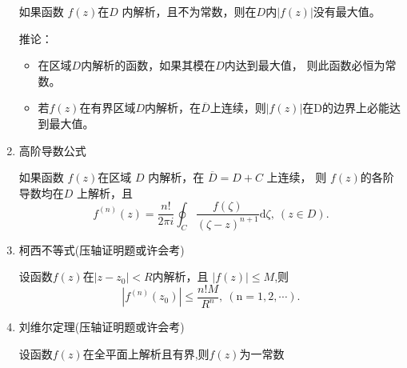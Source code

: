 \documentclass[a4paper,11pt,UTF8]{article}
\begin{document}
\begin{enumerate}
	如果函数 $f(z)$在$D$ 内解析，且不为常数，则在$D$内$\left|f(z)\right|$没有最大值。
	
	推论：
	\begin{itemize}
		\item 在区域$D$内解析的函数，如果其模在$D$内达到最大值， 则此函数必恒为常数。
		\item 若$f(z)$在有界区域$D$内解析，在$\overline{D}$上连续，则$|f(z)|$在D的边界上必能达到最大值。
	\end{itemize}
	\item 高阶导数公式
	
	如果函数 $f(z)$在区域 $D$ 内解析，在 $\overline{D}=D+C$ 上连续， 则 $f(z)$的各阶导数均在$D$ 上解析，且
	$$
	f^{(n)}(z)=\frac{n!}{2\pi i}\oint_C\frac{f(\zeta)}{\left(\zeta-z\right)^{n+1}}\mathrm{d}\zeta,\mathrm{~}(z\in D).
	$$
	\item 柯西不等式(压轴证明题或许会考)
	
	设函数$f(z)$在$|z-z_0|<R$内解析，且 $|f(z)|\leq M$,则
	$$
	|f^{(n)}(z_0)|\leq\frac{n!M}{R^n},\mathrm{~(n=1,2,\cdots)}.
	$$
	
	\item 刘维尔定理(压轴证明题或许会考)
	
	设函数$f(z)$在全平面上解析且有界,则$f(z)$为一常数
	
	
\end{enumerate}
\end{document}
